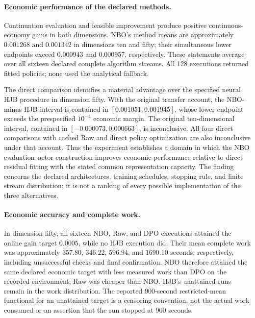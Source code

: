 \paragraph*{Economic performance of the declared methods.}
Continuation evaluation and feasible improvement produce positive
continuous-economy gains in both dimensions. NBO's method means are
approximately $0.001268$ and $0.001342$ in dimensions ten and fifty; their
simultaneous lower endpoints exceed $0.000943$ and $0.000957$, respectively.
These statements average over all sixteen declared complete algorithm
streams. All 128 executions returned fitted policies; none used the
analytical fallback.

The direct comparison identifies a material advantage over the specified
neural HJB procedure in dimension fifty. With the original transfer account,
the NBO-minus-HJB interval is contained in $[0.001051,0.001945]$, whose lower
endpoint exceeds the prespecified $10^{-4}$ economic margin. The original
ten-dimensional interval, contained in $[-0.000073,0.000663]$, is inconclusive.
All four direct comparisons with cached Raw and direct policy optimization
are also inconclusive under that account. Thus the experiment establishes
a domain in which the NBO evaluation--actor construction improves economic
performance relative to direct residual fitting with the stated common
representation capacity. The finding concerns the declared architectures,
training schedules, stopping rule, and finite stream distribution; it is not
a ranking of every possible implementation of the three alternatives.

\paragraph*{Economic accuracy and complete work.}
In dimension fifty, all sixteen NBO, Raw, and DPO executions attained the
online gain target $0.0005$, while no HJB execution did. Their mean complete
work was approximately $357.80$, $346.22$, $596.94$, and $1690.10$ seconds,
respectively, including unsuccessful checks and final confirmation. NBO
therefore attained the same declared economic target with less measured
work than DPO on the recorded environment; Raw was cheaper than NBO.
HJB's unattained runs remain in the work distribution. The reported
900-second restricted-mean functional for an unattained target is a censoring
convention, not the actual work consumed or an assertion that the run stopped
at 900 seconds.

